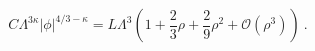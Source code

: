 \begin{equation}
\label{phi_exp}
  C \Lambda^{3\kappa} |\phi|^{4/3-\kappa}  = L \Lambda^3 \left( 1
  +\frac23 \rho + \frac29 \rho^2 +\mathcal{O}(\rho^3) \right)~.
\end{equation}

